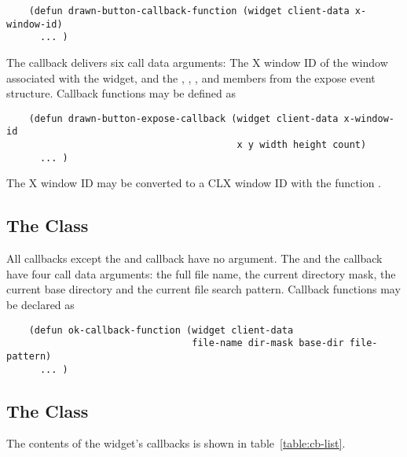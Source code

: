\begin{verbatim}
    (defun drawn-button-callback-function (widget client-data x-window-id)
      ... )
\end{verbatim}

The  callback delivers six call data arguments: The X window ID of
the window associated with the  widget, and the ,
, ,  and  members from the expose
event structure.  Callback functions may be defined as

\begin{verbatim}
    (defun drawn-button-expose-callback (widget client-data x-window-id
                                         x y width height count)
      ... )
\end{verbatim}

The X window ID may be converted to a CLX window ID with the function
.

\subsection{The Class }

All callbacks except the  and  callback have no
 argument.  The  and the  callback have four
call data arguments: the full file name, the current
directory mask, the current base directory and the current file search pattern.
Callback functions may be declared as

\begin{verbatim}
    (defun ok-callback-function (widget client-data
                                 file-name dir-mask base-dir file-pattern)
      ... )
\end{verbatim}

\subsection{The Class }

The contents of the  widget's callbacks is shown in
table~\ref{table:cb-list}. 

